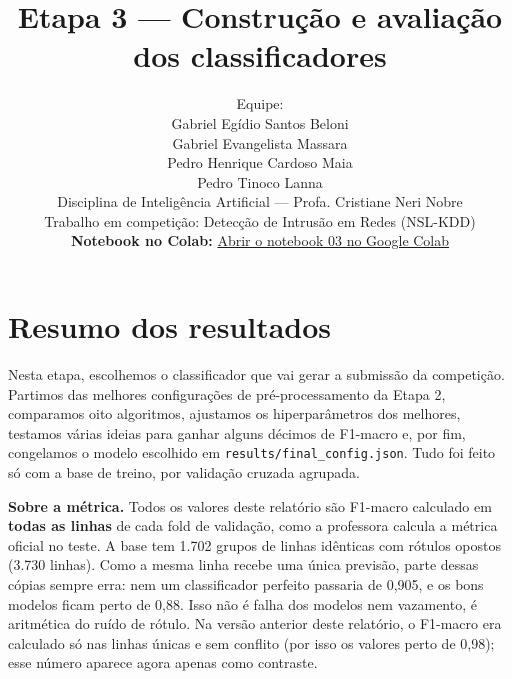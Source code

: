 \documentclass[11pt,a4paper]{article}
\title{Etapa 3 --- Construção e avaliação dos classificadores}
\author{Equipe:\\[2pt]
Gabriel Egídio Santos Beloni\\
Gabriel Evangelista Massara\\
Pedro Henrique Cardoso Maia\\
Pedro Tinoco Lanna\\[4pt]
\small Disciplina de Inteligência Artificial --- Profa. Cristiane Neri Nobre\\
\small Trabalho em competição: Detecção de Intrusão em Redes (NSL-KDD)\\[4pt]
\small \textbf{Notebook no Colab:} \href{https://colab.research.google.com/github/pedro-maia1337/IA-CopaLibertadores/blob/main/notebooks/03_modelagem.ipynb}{Abrir o notebook 03 no Google Colab}
}
\date{}
\begin{document}
\maketitle

\tableofcontents
\clearpage

\section*{Resumo dos resultados}

Nesta etapa, escolhemos o classificador que vai gerar a submissão da competição. Partimos das melhores configurações de pré-processamento da Etapa 2, comparamos oito algoritmos, ajustamos os hiperparâmetros dos melhores, testamos várias ideias para ganhar alguns décimos de F1-macro e, por fim, congelamos o modelo escolhido em \texttt{results/final\_config.json}. Tudo foi feito só com a base de treino, por validação cruzada agrupada.

\textbf{Sobre a métrica.} Todos os valores deste relatório são F1-macro calculado em \textbf{todas as linhas} de cada fold de validação, como a professora calcula a métrica oficial no teste. A base tem 1.702 grupos de linhas idênticas com rótulos opostos (3.730 linhas). Como a mesma linha recebe uma única previsão, parte dessas cópias sempre erra: nem um classificador perfeito passaria de 0,905, e os bons modelos ficam perto de 0,88. Isso não é falha dos modelos nem vazamento, é aritmética do ruído de rótulo. Na versão anterior deste relatório, o F1-macro era calculado só nas linhas únicas e sem conflito (por isso os valores perto de 0,98); esse número aparece agora apenas como contraste.
\end{document}
